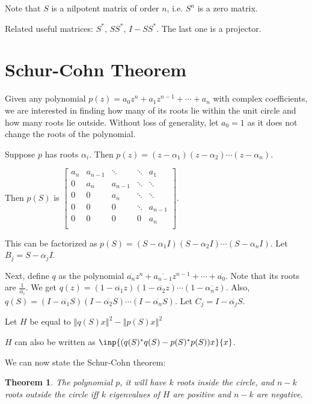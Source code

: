 \documentclass[twofold]{article}
\newcommand*\conj[1]{\overline{#1}}
\newcommand*\adj[1]{#1^*}
\newcommand*\norm[1]{\left \Vert #1 \right\Vert}
\theoremstyle{plain}
\newtheorem{theorem}{Theorem}
\theoremstyle{definition}
\begin{document}
 Note that \(S\) is a nilpotent matrix of order \(n\), i.e. \(S^n\) is a zero matrix.

Related useful matrices: \(\adj{S}\), \(S \adj{S}\), \(I - S \adj{S}\). The last one is a projector. 


\section{Schur-Cohn Theorem}

Given any polynomial \(p(z) = a_0 z^n + a_1z^{n-1} + \cdots + a_n\) with complex coefficients, we are interested in finding how many of its roots lie within the unit circle and how many roots lie outside. Without loss of generality, let \(a_0 = 1\) as it does not change the roots of the polynomial. 

Suppose \(p\) has roots \(\alpha_i\). Then \(p(z) = (z - \alpha_1) (z - \alpha_2) \cdots (z - \alpha_n)\). 

 Then \(p(S) \) is \( \begin{bmatrix} 

a_n & a_{n-1} & \ddots & \ddots & a_1 \\
0 & a_n & a_{n-1} & \ddots & \ddots \\
0 & 0 & a_n & \ddots & \ddots \\
0 & 0 & 0 &\ddots & a_{n-1} \\
0 & 0 & 0 & 0 & a_n \\ 
\end{bmatrix}\). 


This can be factorized as \(p(S) = (S - \alpha_1I) (S - \alpha_2 I) \cdots (S - \alpha_n I)\). Let \(B_j = S - \alpha_jI\).

Next, define \(q\) as the polynomial \(\conj{a_n}z^n + \conj{a_{n-1}}z^{n-1} + \cdots + \conj{a_0}\). Note that its roots are \(\frac {1}{\conj{\alpha_i}}\). We get \(q(z) = (1 - \conj{\alpha_1}z) (1 - \conj{\alpha_2}z) \cdots (1 - \conj{\alpha_nz})\). Also, \(q(S) = (I - \conj{\alpha_1}S) (I - \conj{\alpha_2}S) \cdots (I - \conj{\alpha_n}S)\). Let \(C_j= I -  \conj{\alpha_j} S\).


Let \(H\) be equal to \(\norm{ q(S) x }^2 - \norm{ p(S) x}^2\)

\(H\) can also be written as \(\inp{(\adj{q(S)} q(S) - \adj{p(S)} p(S))x}{ x}\).

We can now state the Schur-Cohn theorem:

\begin{theorem}The polynomial \(p\), it will have \(k\) roots inside the circle, and \(n-k\) roots outside the circle iff \(k\) eigenvalues of \(H\) are positive and \(n-k\) are negative. \end{theorem}
\end{document}
